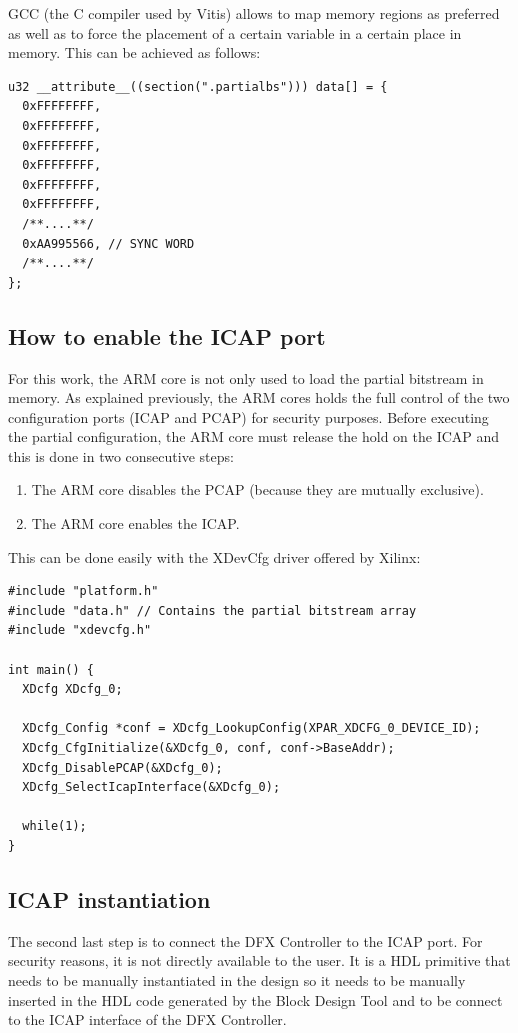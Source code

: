 GCC (the C compiler used by Vitis) allows to map memory regions as preferred as well as to force the placement of a certain variable in a certain place in memory. This can be achieved as follows:

\begin{lstlisting}[style=C]
u32 __attribute__((section(".partialbs"))) data[] = {
  0xFFFFFFFF,
  0xFFFFFFFF,
  0xFFFFFFFF,
  0xFFFFFFFF,
  0xFFFFFFFF,
  0xFFFFFFFF,
  /**....**/
  0xAA995566, // SYNC WORD
  /**....**/
};
\end{lstlisting}

\subsection{How to enable the ICAP port}
For this work, the ARM core is not only used to load the partial bitstream in memory. As explained previously, the ARM cores holds the full control of the two configuration ports (ICAP and PCAP) for security purposes. Before executing the partial configuration, the ARM core must release the hold on the ICAP and this is done in two consecutive steps:
\begin{enumerate}
    \item The ARM core disables the PCAP (because they are mutually exclusive).
    \item The ARM core enables the ICAP.
\end{enumerate}

This can be done easily with the XDevCfg driver offered by Xilinx:

\begin{lstlisting}[style=C]
#include "platform.h"
#include "data.h" // Contains the partial bitstream array
#include "xdevcfg.h"

int main() {
  XDcfg XDcfg_0;

  XDcfg_Config *conf = XDcfg_LookupConfig(XPAR_XDCFG_0_DEVICE_ID);
  XDcfg_CfgInitialize(&XDcfg_0, conf, conf->BaseAddr);
  XDcfg_DisablePCAP(&XDcfg_0);
  XDcfg_SelectIcapInterface(&XDcfg_0);

  while(1);
}

\end{lstlisting}


\subsection{ICAP instantiation}
The second last step is to connect the DFX Controller to the ICAP port. For security reasons, it is not directly available to the user. It is a HDL primitive that needs to be manually instantiated in the design so it needs to be manually inserted in the HDL code generated by the Block Design Tool and to be connect to the ICAP interface of the DFX Controller. \bigskip

